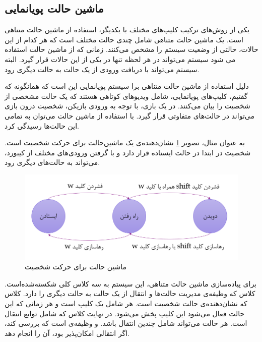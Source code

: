 \subsection{ماشین حالت پویانمایی}

یکی از روش‌های ترکیب کلیپ‌های مختلف با یکدیگر، استفاده از ماشین حالت متناهی است.
یک ماشین‌ حالت متناهی شامل چندی حالت مختلف است
که هر کدام از این حالات، حالتی از وضعیت سیستم را مشخص می‌کنند.
زمانی که از ماشین حالت استفاده می شود سیستم می‌تواند در هر لحظه تنها در یکی از این حالات قرار گیرد.
البته سیستم می‌تواند با دریافت ورودی از یک حالت به حالت دیگری رود.

دلیل استفاده از ماشین حالت متناهی برا سیستم پویانمایی این است که همانگونه که گفتیم، کلیپ‌های پویانمایی، شامل ویدیو‌های کوتاهی هستند که یک حالت مشخصی از شخصیت را بیان می‌کنند.
در یک بازی، با توجه به ورودی بازیکن، شخصیت درون بازی می‌تواند در حالت‌های متفاوتی قرار گیرد. با استفاده از ماشین حالت می‌توان به تمامی این حالت‌ها رسیدگی کرد.

به عنوان مثال، تصویر 
\ref{fig:LocomotionStateMachine}
نشان‌دهنده‌ی یک ماشین‌حالت برای حرکت شخصیت است. شخصیت در ابتدا در حالت ایستاده قرار دارد و با گرفتن
ورودی‌های مختلف از کیبورد، می‌تواند به حالت‌های دیگری رود.

\begin{figure}[ht]
	\centerline{\includegraphics[width=\textwidth,height=\textheight,keepaspectratio]{Figures/Ch5/LocomotionStateMachine.png}}

	\caption{ماشین حالت برای حرکت شخصیت}
	\label{fig:LocomotionStateMachine}
\end{figure}


برای پیا‌ده‌سازی ماشین حالت متناهی، این سیستم به سه کلاس کلی شکسته‌شده‌است. کلاس
که وظیفه‌ی مدیریت حالت‌ها و انتقال از یک حالت به حالت دیگری را دارد.
کلاس 
که نشان‌دهنده‌ی حالت شخصیت است. هر 
شامل یک کلیپ است و هر زمانی که این حالت فعال می‌شود این کلیپ پخش می‌شود.
 در نهایت کلاس
که شامل توابع انتقال است.
هر حالت می‌تواند شامل چندین انتقال باشد. و وظیفه‌ی
است که بررسی کند، اگر انتقالی امکان‌پذیر بود، آن را انجام دهد.

